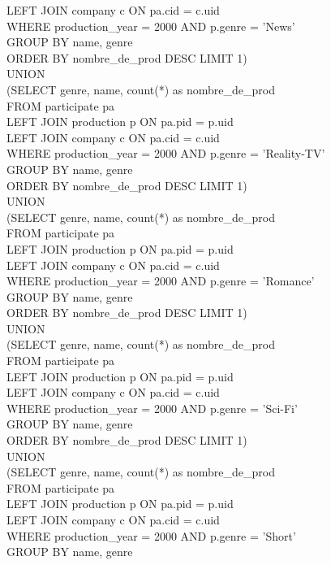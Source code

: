 \documentclass{article}
\begin{document}
LEFT JOIN company c ON pa.cid = c.uid\\
WHERE production_year = 2000 AND p.genre = 'News'\\  
GROUP BY name, genre\\
ORDER BY nombre_de_prod DESC LIMIT 1)\\
UNION\\
(SELECT genre, name, count(*) as nombre_de_prod\\
FROM participate pa\\
LEFT JOIN production p ON pa.pid = p.uid\\
LEFT JOIN company c ON pa.cid = c.uid\\
WHERE production_year = 2000 AND p.genre = 'Reality-TV'  \\
GROUP BY name, genre\\
ORDER BY nombre_de_prod DESC LIMIT 1)\\
UNION \\
(SELECT genre, name, count(*) as nombre_de_prod\\
FROM participate pa\\
LEFT JOIN production p ON pa.pid = p.uid\\
LEFT JOIN company c ON pa.cid = c.uid\\
WHERE production_year = 2000 AND p.genre = 'Romance'\\  
GROUP BY name, genre\\
ORDER BY nombre_de_prod DESC LIMIT 1)\\
UNION\\
(SELECT genre, name, count(*) as nombre_de_prod\\
FROM participate pa\\
LEFT JOIN production p ON pa.pid = p.uid\\
LEFT JOIN company c ON pa.cid = c.uid\\
WHERE production_year = 2000 AND p.genre = 'Sci-Fi'  \\
GROUP BY name, genre\\
ORDER BY nombre_de_prod DESC LIMIT 1)\\
UNION\\
(SELECT genre, name, count(*) as nombre_de_prod\\
FROM participate pa\\
LEFT JOIN production p ON pa.pid = p.uid\\
LEFT JOIN company c ON pa.cid = c.uid\\
WHERE production_year = 2000 AND p.genre = 'Short'  \\
GROUP BY name, genre\\
\end{document}
